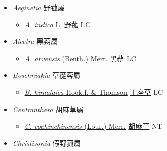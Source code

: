 
  \begin{itemize}
 \item[] \textit{Aeginetia} 野菰屬
                    
  \begin{itemize}
        \item[] \href{http://www.theplantlist.org/tpl1.1/search?q=Aeginetia+indica}{\textit{A. indica} L.}   \href{\detokenize{http://taibnet.sinica.edu.tw/chi/taibnet_species_list.php?T2=野菰&T2_new_value=true&fr=y}}{野菰} LC
  \end{itemize}
 \item[] \textit{Alectra} 黑蒴屬
                    
  \begin{itemize}
        \item[] \href{http://www.theplantlist.org/tpl1.1/search?q=Alectra+arvensis}{\textit{A. arvensis} (Benth.) Merr.}     \href{\detokenize{http://taibnet.sinica.edu.tw/chi/taibnet_species_list.php?T2=黑蒴&T2_new_value=true&fr=y}}{黑蒴} LC
  \end{itemize}
 \item[] \textit{Boschniakia} 草蓯蓉屬
                    
  \begin{itemize}
        \item[] \href{http://www.theplantlist.org/tpl1.1/search?q=Boschniakia+himalaica}{\textit{B. himalaica} Hook.f. \& Thomson}   \href{\detokenize{http://taibnet.sinica.edu.tw/chi/taibnet_species_list.php?T2=丁座草&T2_new_value=true&fr=y}}{丁座草} LC
  \end{itemize}
 \item[] \textit{Centranthera} 胡麻草屬
                    
  \begin{itemize}
        \item[] \href{http://www.theplantlist.org/tpl1.1/search?q=Centranthera+cochinchinensis}{\textit{C. cochinchinensis} (Lour.) Merr.}   \href{\detokenize{http://taibnet.sinica.edu.tw/chi/taibnet_species_list.php?T2=胡麻草&T2_new_value=true&fr=y}}{胡麻草} NT
  \end{itemize}
 \item[] \textit{Christisonia} 假野菰屬
                    

\end{itemize}
